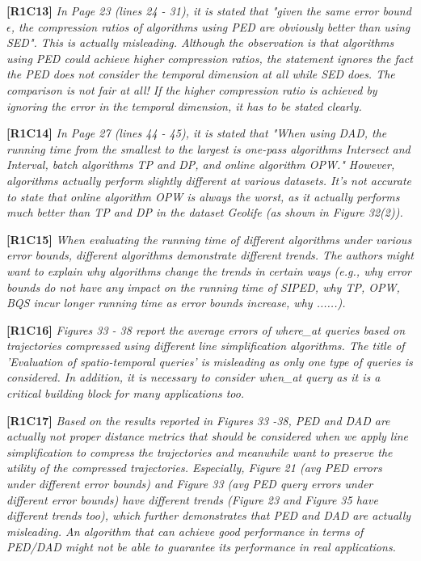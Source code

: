 \documentclass{letter}
\begin{document}
\textbf{[R1C13]} \emph{ In Page 23 (lines 24 - 31), it is stated that "given the same error bound $\epsilon$, the compression ratios of algorithms using PED are obviously better than using SED". This is actually misleading. Although the observation is that algorithms using PED could achieve higher compression ratios, the statement ignores the fact the PED does not consider the temporal dimension at all while SED does. The comparison is not fair at all! If the higher compression ratio is achieved by ignoring the error in the temporal dimension, it has to be stated clearly.} 

\textbf{[R1C14]} \emph{ In Page 27 (lines 44 - 45), it is stated that "When using DAD, the running time from the smallest to the largest is one-pass algorithms Intersect and Interval, batch algorithms TP and DP, and online algorithm OPW." However, algorithms actually perform slightly different at various datasets. It's not accurate to state that online algorithm OPW is always the worst, as it actually performs much better than TP and DP in the dataset Geolife (as shown in Figure 32(2)).}

\textbf{[R1C15]} \emph{ When evaluating the running time of different algorithms under various error bounds, different algorithms demonstrate different trends. The authors might want to explain why algorithms change the trends in certain ways (e.g., why error bounds do not have any impact on the running time of SIPED, why TP, OPW, BQS incur longer running time as error bounds increase, why ......).}

\textbf{[R1C16]} \emph{ Figures 33 - 38 report the average errors of where\_at queries based on trajectories compressed using different line simplification algorithms. The title of 'Evaluation of spatio-temporal queries' is misleading as only one type of queries is considered. In addition, it is necessary to consider when\_at query as it is a critical building block for many applications too.} 

\textbf{[R1C17]} \emph{ Based on the results reported in Figures 33 -38, PED and DAD are actually not proper distance metrics that should be considered when we apply line simplification to compress the trajectories and meanwhile want to preserve the utility of the compressed trajectories. Especially, Figure 21 (avg PED errors under different error bounds) and Figure 33 (avg PED query errors under different error bounds) have different trends (Figure 23 and Figure 35 have different trends too), which further demonstrates that PED and DAD are actually misleading. An algorithm that can achieve good performance in terms of PED/DAD might not be able to guarantee its performance in real applications. }
\end{document}
